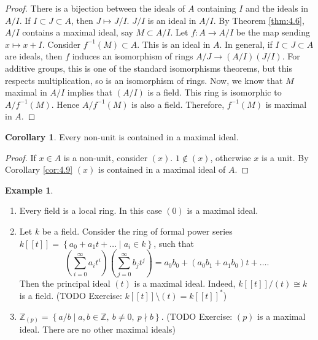 \documentclass{article}
\newcommand{\Z}{\mathbb{Z}}
\newcommand{\rb}[1]{\left( #1 \right)}
\renewcommand{\sb}[1]{\left[ #1 \right]}
\newcommand{\cb}[1]{\left\{ #1 \right\}}
\theoremstyle{definition}\newtheorem{definition}{Definition}[section]
\theoremstyle{definition}\newtheorem{remark}[definition]{Remark}
\theoremstyle{definition}\newtheorem*{example}{Example}
\theoremstyle{definition}\newtheorem*{note}{Note}
\newtheorem{corollary}[definition]{Corollary}
\begin{document}
\begin{proof}
There is a bijection between the ideals of $ A $ containing $ I $ and the ideals in $ A / I $. If $ I \subset J \subset A $, then $ J \mapsto J / I $. $ J / I $ is an ideal in $ A / I $. By Theorem \ref{thm:4.6}, $ A / I $ contains a maximal ideal, say $ M \subset A / I $. Let $ f : A \to A / I $ be the map sending $ x \mapsto x + I $. Consider $ f^{-1}\rb{M} \subset A $. This is an ideal in $ A $. In general, if $ I \subset J \subset A $ are ideals, then $ f $ induces an isomorphism of rings $ A / J \to \rb{A / I}\rb{J / I} $. For additive groups, this is one of the standard isomorphisms theorems, but this respects multiplication, so is an isomorphism of rings. Now, we know that $ M $ maximal in $ A / I $ implies that $ \rb{A / I} $ is a field. This ring is isomorphic to $ A / f^{-1}\rb{M} $. Hence $ A / f^{-1}\rb{M} $ is also a field. Therefore, $ f^{-1}\rb{M} $ is maximal in $ A $.
\end{proof}

\begin{corollary}
\label{cor:4.10}
Every non-unit is contained in a maximal ideal.
\end{corollary}

\begin{proof}
If $ x \in A $ is a non-unit, consider $ \rb{x} $. $ 1 \notin \rb{x} $, otherwise $ x $ is a unit. By Corollary \ref{cor:4.9} $ \rb{x} $ is contained in a maximal ideal of $ A $.
\end{proof}

\begin{example}
\hfill
\begin{enumerate}
\item Every field is a local ring. In this case $ \rb{0} $ is a maximal ideal.
\item Let $ k $ be a field. Consider the ring of formal power series $ k\sb{\sb{t}} = \cb{a_0 + a_1t + \dots \mid a_i \in k} $, such that
$$ \rb{\sum_{i = 0}^\infty a_it^i}\rb{\sum_{j = 0}^\infty b_jt^j} = a_0b_0 + \rb{a_0b_1 + a_1b_0}t + \dots. $$
Then the principal ideal $ \rb{t} $ is a maximal ideal. Indeed, $ k\sb{\sb{t}} / \rb{t} \cong k $ is a field. (TODO Exercise: $ k\sb{\sb{t}} \setminus \rb{t} = k\sb{\sb{t}}^* $)
\item $ \Z_{\rb{p}} = \cb{a / b \mid a, b \in \Z, \ b \ne 0, \ p \nmid b} $. (TODO Exercise: $ \rb{p} $ is a maximal ideal. There are no other maximal ideals)
\end{enumerate}
\end{example}
\end{document}
